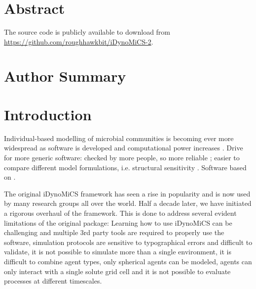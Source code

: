 \documentclass[10pt,letterpaper]{article}
\begin{document}
\section*{Abstract}


The source code is publicly available to download from \url{https://github.com/roughhawkbit/iDynoMiCS-2}.

\section*{Author Summary}

\linenumbers

\section*{Introduction}
Individual-based modelling of microbial communities is becoming ever more widespread as software is developed and computational power increases \cite{Ferrer2008}.
Drive for more generic software:
checked by more people, so more reliable \cite{Joppa2013};
easier to compare different model formulations, i.e. structural sensitivity  \cite{Adamson2012}. %
Software based on \cite{Kreft1998, Lardon2011, Storck2014}. 


The original iDynoMiCS framework \cite{Lardon2011} has seen a rise in popularity and is now used by many research groups all over the world. Half a decade later, we have initiated a rigorous overhaul of the framework. This is done to address several evident limitations of the original package: Learning how to use iDynoMiCS can be challenging and multiple 3rd party tools are required to properly use the software, simulation protocols are sensitive to typographical errors and difficult to validate, it is not possible to simulate more than a single environment, it is difficult to combine agent types, only spherical agents can be modeled, agents can only interact with a single solute grid cell and it is not possible to evaluate processes at different timescales.
\end{document}
